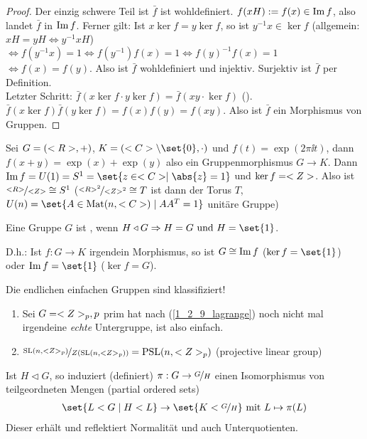 \begin{proof} %
	Der einzig schwere Teil ist $\bar{f}$ ist wohldefiniert. $f(xH) := f(x) \in \operatorname{Im} f$, also landet $\bar{f}$ in $\operatorname{Im} f$. Ferner gilt: Ist $x \ker f = y \ker f$, so ist $y^{-1}x \in \ker f$ (allgemein: $xH = yH \Leftrightarrow y^{-1}xH$) $\Leftrightarrow f(y^{-1}x) = 1 \Leftrightarrow f(y^{-1})f(x) = 1 \Leftrightarrow f(y)^{-1}f(x) = 1$ $\Leftrightarrow f(x) = f(y)$. Also ist $\bar{f}$ wohldefiniert und injektiv. Surjektiv ist $\bar{f}$ per Definition.\\
	Letzter Schritt: $\bar{f}(x \ker f \cdot y \ker f) = \bar{f}(xy \cdot \ker f)$ (). $\bar{f}(x \ker f)\bar{f}(y\ker f) = f(x)f(y) = f(xy)$. Also ist $\bar{f}$ ein Morphismus von Gruppen.
\end{proof}
\begin{example}
	Sei $G = (<R>, +)$, $K = (\C\setminus \set{0},\cdot)$ und $f(t) = \exp(2\pi \ii t)$, dann $f(x+y) = \exp(x) + \exp(y)$ also ein Gruppenmorphismus $G \to K$. Dann $\Image f = U(1) = S^1 = \set{z \in \C \mid \abs{z} = 1}$ und $\ker f = <Z>$. Also ist $\lnkset{\R}{\Z} \cong S^1$ ($\lnkset{\R^2}{\Z^2} \cong T$ ist dann der Torus $T$, $U(n) = \set{A \in \Mat(n, \C) \mid AA^T = 1}$ unitäre Gruppe)
\end{example}
\begin{definition}
	Eine Gruppe $G$ ist , wenn $H \lhd G \implies H = G \und H = \set{1}$.
\end{definition}
\begin{*remark}
	D.h.: Ist $f: G \to K$ irgendein Morphismus, so ist $G \cong \operatorname{Im} f$ ($\ker f = \set{1}$) oder $\Image f = \set{1}$ ($\ker f = G$).
\end{*remark}
Die endlichen einfachen Gruppen sind klassifiziert!
\begin{example}
	\begin{enumerate}
		\item Sei $G = <Z>_p, p$ prim hat nach  (\cref{1_2_9_lagrange}) noch nicht mal irgendeine \emph{echte} Untergruppe, ist also einfach.
		\item $\lnkset{\SL(n, \Z_p)}{Z(\SL(n, \Z_p))} = \PSL(n, \Z_p)$ (projective linear group)
	\end{enumerate}
\end{example}
\begin{proposition}[Korrespondenztheorem]
	Ist $H \lhd G$, so induziert (definiert) $\pi: G \to \lnkset{G}{H}$ einen Isomorphismus von teilgeordneten Mengen (partial ordered sets)
	\begin{align*}
		\set{L < G \mid H < L} \to \set{K < \lnkset{G}{H}} \mit L \mapsto \pi(L)
	\end{align*}
	Dieser erhält und reflektiert Normalität und auch Unterquotienten. 
\end{proposition}
